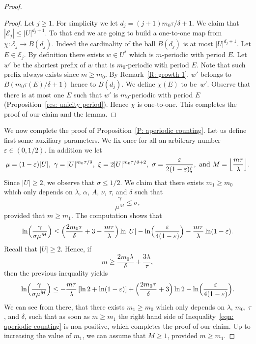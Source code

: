 \documentclass[JEP,XML,SOM,Unicode, NoEqCountersInSection,published]{cedram}
\let\mathcal\mathscr
\let\epsilon\varepsilon
\theoremstyle{plain}
\theoremstyle{definition}
\begin{document}
\begin{proof}
\begin{proof}
Let $j \geq 1$.
For simplicity we let $d_j = (j+1)m_0\tau/\delta + 1$.
We claim that $| \mathcal E_j | \leq |U|^{d_j +1}$.
To that end we are going to build a one-to-one map from $\chi\colon\mathcal E_j \to B(d_j)$.
Indeed the cardinality of the ball $B(d_j)$ is at most $|U|^{d_j+1}$.
Let $E\in \mathcal{E}_j$.
By definition there exists $w \in U^*$ which is $m$-periodic with period $E$.
Let $w'$ be the shortest prefix of $w$ that is $m_0$-periodic with period $E$.
Note that such prefix always exists since $m\geq m_0$.
By Remark~\ref{R: growth 1}, $w'$ belongs to $B(m_0 \tau(E)/\delta+1)$ hence to $B(d_j)$.
We define $\chi(E)$ to be~$w'$.
Observe that there is at most one $E$ such that $w'$ is $m_0$-periodic with period $E$ (Proposition~\ref{res: unicity period}).
Hence $\chi$ is one-to-one.
This completes the proof of our claim and the lemma.
\end{proof}

We now complete the proof of Proposition~\ref{P: aperiodic counting}.
Let us define first some auxiliary parameters.
We fix once for all an arbitrary number $\epsilon \in (0,1/2)$.
In addition we let
\begin{equation*}
\mu = (1-\epsilon) |U|, \
\gamma = |U|^{m_0\tau/\delta}, \
\xi = 2 |U|^{m_0\tau/\delta + 2}, \
\sigma = \frac{ \epsilon}{2(1-\epsilon) \xi},
\ \text{and }
M = \Bigl\lfloor \frac{m\tau}\lambda \Bigr\rfloor.
\end{equation*}
Since $|U| \geq 2$, we observe that $\sigma \leq 1/2$.
We claim that there exists $m_1 \geq m_0$ which only depends on $\lambda$, $\alpha$, $A$, $\nu$, $\tau$, and $\delta$ such that
\begin{equation*}
\frac \gamma{\mu^M} \leq \sigma,
\end{equation*}
provided that $m \geq m_1$.
The computation shows that
\begin{equation*}
\ln \Bigl( \frac \gamma{\sigma \mu^M} \Bigr)
\leq \Bigl(\frac {2 m_0\tau}\delta + 3 - \frac {m\tau}\lambda\Bigr) \ln |U| - \ln\Bigl(\frac \epsilon {4(1-\epsilon)}\Bigr) - \frac {m\tau}\lambda \ln (1-\epsilon).
\end{equation*}
Recall that $|U| \geq 2$.
Hence, if
\begin{equation*}
m \geq \frac {2m_0\lambda}\delta + \frac{3\lambda}{\tau},
\end{equation*}
then the previous inequality yields
\begin{equation}
\label{eqn: aperiodic counting}
\ln \Bigl( \frac \gamma{\sigma \mu^M} \Bigr)
\leq - \frac{m\tau}\lambda \left[ \ln 2 + \ln (1 - \epsilon)\right] +
\Bigl(\frac {2 m_0\tau}\delta + 3 \Bigr) \ln 2 - \ln\Bigl(\frac \epsilon {4(1-\epsilon)}\Bigr).
\end{equation}
We can see from there, that there exists $m_1 \geq m_0$ which only depends on $\lambda$, $m_0$, $\tau$, and $\delta$, such that as soon as $m \geq m_1$ the right hand side of Inequality~\eqref{eqn: aperiodic counting} is non-positive, which completes the proof of our claim.
Up to increasing the value of $m_1$, we can assume that $M \geq 1$, provided $m \geq m_1$.


\end{proof}
\end{document}
